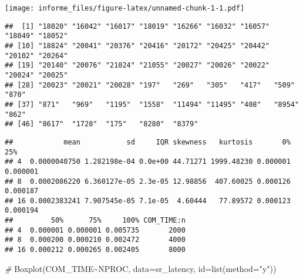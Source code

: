 \documentclass[
]{article}
\newenvironment{Shaded}{\begin{snugshade}}{\end{snugshade}}
\newcommand{\AttributeTok}[1]{\textcolor[rgb]{0.77,0.63,0.00}{#1}}
\newcommand{\CommentTok}[1]{\textcolor[rgb]{0.56,0.35,0.01}{\textit{#1}}}
\newcommand{\ConstantTok}[1]{\textcolor[rgb]{0.00,0.00,0.00}{#1}}
\newcommand{\DecValTok}[1]{\textcolor[rgb]{0.00,0.00,0.81}{#1}}
\newcommand{\FunctionTok}[1]{\textcolor[rgb]{0.00,0.00,0.00}{#1}}
\newcommand{\NormalTok}[1]{#1}
\newcommand{\OtherTok}[1]{\textcolor[rgb]{0.56,0.35,0.01}{#1}}
\newcommand{\SpecialCharTok}[1]{\textcolor[rgb]{0.00,0.00,0.00}{#1}}
\newcommand{\StringTok}[1]{\textcolor[rgb]{0.31,0.60,0.02}{#1}}
\begin{document}
\texttt{[image: informe\_files/figure-latex/unnamed-chunk-1-1.pdf]}

\begin{verbatim}
##  [1] "18020" "16042" "16017" "18019" "16266" "16032" "16057" "18049" "18052"
## [10] "18824" "20041" "20376" "20416" "20172" "20425" "20442" "20102" "20264"
## [19] "20140" "20076" "21024" "21055" "20027" "20026" "20022" "20024" "20025"
## [28] "20023" "20021" "20028" "197"   "269"   "305"   "417"   "509"   "870"  
## [37] "871"   "969"   "1195"  "1558"  "11494" "11495" "408"   "8954"  "862"  
## [46] "8617"  "1728"  "175"   "8280"  "8379"
\end{verbatim}

\begin{Shaded}
\end{Shaded}

\begin{verbatim}
##            mean           sd     IQR skewness   kurtosis       0%      25%
## 4  0.0000040750 1.282198e-04 0.0e+00 44.71271 1999.48230 0.000001 0.000001
## 8  0.0002086220 6.360127e-05 2.3e-05 12.98856  407.60025 0.000126 0.000187
## 16 0.0002383241 7.907545e-05 7.1e-05  4.60444   77.89572 0.000123 0.000194
##         50%      75%     100% COM_TIME:n
## 4  0.000001 0.000001 0.005735       2000
## 8  0.000200 0.000210 0.002472       4000
## 16 0.000212 0.000265 0.002405       8000
\end{verbatim}

\begin{Shaded}
\begin{Highlighting}[]
\CommentTok{\# }
\FunctionTok{Boxplot}\NormalTok{(COM\_TIME}\SpecialCharTok{\textasciitilde{}}\NormalTok{NPROC, }\AttributeTok{data=}\NormalTok{sr\_latency, }\AttributeTok{id=}\FunctionTok{list}\NormalTok{(}\AttributeTok{method=}\StringTok{"y"}\NormalTok{))}
\end{Highlighting}
\end{Shaded}
\end{document}
